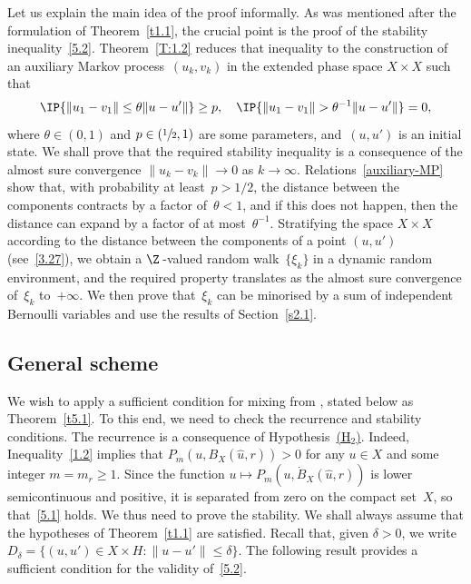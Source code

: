 Let us explain the main idea of the proof informally. As was mentioned after the formulation of Theorem~\ref{t1.1}, the crucial point is the proof of the stability inequality~\eqref{5.2}. Theorem~\ref{T:1.2} reduces that inequality to the construction of an auxiliary Markov process~$(u_k,v_k)$ in the extended phase space $X\times X$ such that\vspace*{-3pt}
\begin{equation} \label{auxiliary-MP}
\IP\{\|u_1-v_1\|\le \theta\|u-u'\|\}\ge p,\quad \IP\{\|u_1-v_1\|> \theta^{-1}\|u-u'\|\}=0,
\end{equation}
where $\theta\in(0,1)$ and $p\in(\sfrac12,1)$ are some parameters, and~$(u,u')$ is an initial state. We shall prove that the required stability inequality is a consequence of the almost sure convergence $\|u_k-v_k\|\to0$ as $k\to\infty$. Relations~\eqref{auxiliary-MP} show that, with probability at least~$p>1/2$, the distance between the components contracts by a factor of~$\theta<1$, and if this does not happen, then the distance can expand by a factor of at most~$\theta^{-1}$. Stratifying the space $X\times X$ according to the distance between the components of a point $(u,u')$ (see~\eqref{3.27}), we obtain a $\Z\,$-valued random walk~$\{\xi_k\}$ in a dynamic random environment, and the required property translates as the almost sure convergence of~$\xi_k$ to~$+\infty$. We then prove that~$\xi_k$ can be minorised by a sum of independent Bernoulli variables and use the results of Section~\ref{s2.1}.

\subsection{General scheme}
\label{s3.1}
We wish to apply a sufficient condition for mixing from \cite[\S 3.1.2]{KS-book}, stated below as Theorem~\ref{t5.1}. To this end, we need to check the recurrence and stability conditions. The recurrence is a consequence of Hypothesis~\hyperlink{H1}{(H$_2$)}. \hbox{Indeed}, Inequality~\eqref{1.2} implies that $P_m(u,B_X(\hat u,r))>0$ for any $u\in X$ and some integer $m=m_r\ge1$. Since the function $u\mapsto P_m(u,\dot B_X(\hat u,r))$ is lower semicontinuous and positive, it is separated from zero on the compact set~$X$, so that~\eqref{5.1} holds. We thus need to prove the stability. We shall always assume that the hypotheses of Theorem~\ref{t1.1} are satisfied. Recall that, given $\delta>0$, we write $D_\delta=\{(u,u')\in X\times H:\|u-u'\|\le\delta\}$. The following result provides a sufficient condition for the validity of~\eqref{5.2}.

